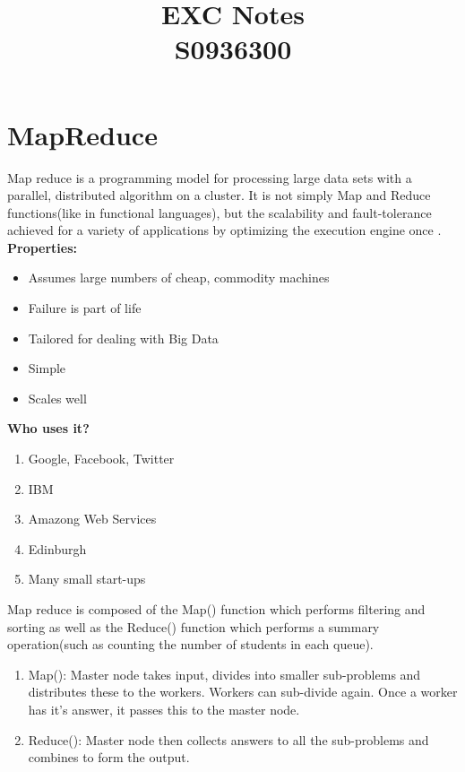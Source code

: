\documentclass[11pt]{article}
\begin{document}
\title{EXC Notes \\ S0936300}
\maketitle

\section{MapReduce}

Map reduce is a programming model for processing large data sets with a parallel, distributed algorithm on a cluster. It is not simply Map and Reduce functions(like in functional languages), but the scalability and fault-tolerance achieved for a variety of applications by optimizing the execution engine once \cite{wiki}.\\

\textbf{Properties:}
\begin{itemize}
\item Assumes large numbers of cheap, commodity machines
\item Failure is part of life
\item Tailored for dealing with Big Data
\item Simple
\item Scales well
\end{itemize}

\textbf{Who uses it?}

\begin{enumerate}
\item Google, Facebook, Twitter
\item IBM
\item Amazong Web Services
\item Edinburgh
\item Many small start-ups
\end{enumerate}

Map reduce is composed of the Map() function which performs filtering and sorting as well as the Reduce() function which performs a summary operation(such as counting the number of students in each queue).

\begin{enumerate}
\item Map(): Master node takes input, divides into smaller sub-problems and distributes these to the workers. Workers can sub-divide again. Once a worker has it's answer, it passes this to the master node.
\item Reduce(): Master node then collects answers to all the sub-problems and combines to form the output.
\end{enumerate}
\end{document}
